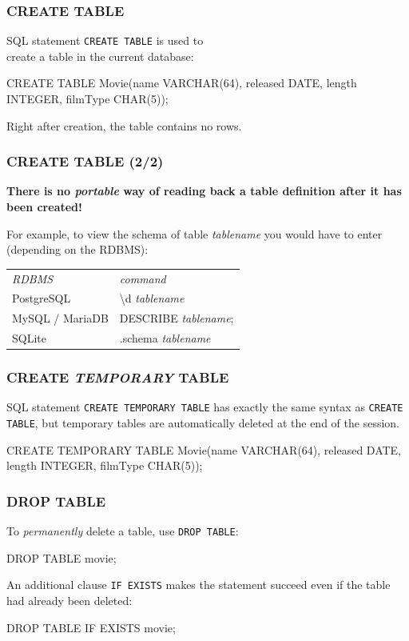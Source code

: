 \documentclass[english,serif,mathserif]{beamer}
\begin{document}
\begin{frame}[fragile]
  \frametitle{CREATE TABLE}

  SQL statement \texttt{CREATE TABLE} is used to \\
  create a table in the current database:
  \begin{sql}
    CREATE TABLE Movie(name VARCHAR(64), released DATE,
                       length INTEGER,   filmType CHAR(5));
  \end{sql}

  \+
  Right after creation, the table contains no rows.
\end{frame}


\begin{frame}[fragile]
  \frametitle{CREATE TABLE (2/2)}

  {\bfseries
    There is no \emph{portable} way of reading back a table
    definition after it has been created!}

  \+
  For example, to view the schema of table {\em\ttfamily tablename} you would
  have to enter (depending on the RDBMS):

  \+
  \begin{tabular}{l>{\ttfamily}l}

    {\em RDBMS}    & {\normalfont\em command}             \\
    PostgreSQL     & {{\textbackslash}d \emph{tablename}} \\
    MySQL / MariaDB& {DESCRIBE \emph{tablename}}; \\
    SQLite         & {.schema \emph{tablename}} \\
  \end{tabular}
\end{frame}


\begin{frame}[fragile]
  \frametitle{CREATE \emph{TEMPORARY} TABLE}

  SQL statement \texttt{CREATE TEMPORARY TABLE} has exactly the same syntax as
  \texttt{CREATE TABLE}, but temporary tables are automatically deleted at the
  end of the session.

  \+
  \begin{sql}
CREATE TEMPORARY TABLE
    Movie(name VARCHAR(64), released DATE,
          length INTEGER,   filmType CHAR(5));
  \end{sql}
\end{frame}


\begin{frame}[fragile]
  \frametitle{DROP TABLE}

  To \emph{permanently} delete a table, use \texttt{DROP TABLE}:
  \begin{sql}
    DROP TABLE movie;
  \end{sql}

  \+
  An additional clause \texttt{IF EXISTS} makes the statement succeed even if
  the table had already been deleted:
  \begin{sql}
    DROP TABLE IF EXISTS movie;
  \end{sql}

\end{frame}
\end{document}
